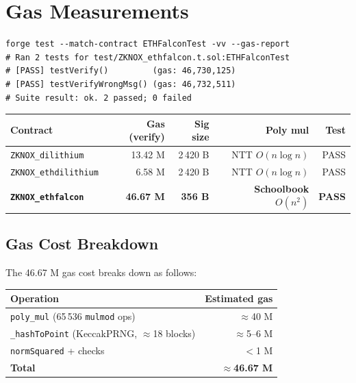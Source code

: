 \documentclass[11pt,a4paper]{article}
\begin{document}
\section{Gas Measurements}

\begin{resultbox}
\begin{lstlisting}[style=bash]
forge test --match-contract ETHFalconTest -vv --gas-report
# Ran 2 tests for test/ZKNOX_ethfalcon.t.sol:ETHFalconTest
# [PASS] testVerify()         (gas: 46,730,125)
# [PASS] testVerifyWrongMsg() (gas: 46,732,511)
# Suite result: ok. 2 passed; 0 failed
\end{lstlisting}
\end{resultbox}

\begin{center}
\begin{tabular}{lrrrr}
\toprule
\textbf{Contract} & \textbf{Gas (verify)} & \textbf{Sig size} & \textbf{Poly mul} & \textbf{Test} \\
\midrule
\texttt{ZKNOX\_dilithium}    & 13.42 M & 2\,420 B & NTT $O(n\log n)$ & PASS \\
\texttt{ZKNOX\_ethdilithium} &  6.58 M & 2\,420 B & NTT $O(n\log n)$ & PASS \\
\textbf{\texttt{ZKNOX\_ethfalcon}} & \textbf{46.67 M} & \textbf{356 B} & \textbf{Schoolbook $O(n^2)$} & \textbf{PASS} \\
\bottomrule
\end{tabular}
\end{center}

\subsection{Gas Cost Breakdown}

The 46.67 M gas cost breaks down as follows:

\begin{center}
\begin{tabular}{lr}
\toprule
\textbf{Operation} & \textbf{Estimated gas} \\
\midrule
\texttt{poly\_mul} (65\,536 \texttt{mulmod} ops) & $\approx$40 M \\
\texttt{\_hashToPoint} (KeccakPRNG, $\approx$18 blocks) & $\approx$5--6 M \\
\texttt{normSquared} + checks                            & $<$1 M \\
\midrule
\textbf{Total}                                           & \textbf{$\approx$46.67 M} \\
\bottomrule
\end{tabular}
\end{center}
\end{document}
